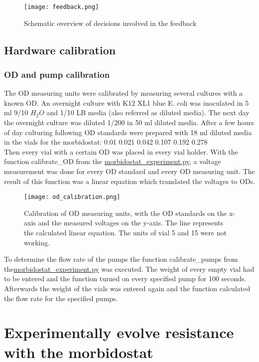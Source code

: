 \begin{figure}
	\texttt{[image: feedback.png]}
	\caption{Schematic overview of decisions involved in the feedback}
	\label{figure:feedback}
\end{figure}

\subsection{Hardware calibration}
\subsubsection{OD and pump calibration}
The OD measuring units were calibrated by measuring several cultures with a known OD.
An overnight culture with K12 XL1 blue E. coli was inoculated in 5 ml 9/10 $H_2O$ and 1/10 LB media (also referred as diluted media). The next day the overnight culture was diluted 1/200 in 50 ml diluted media. After a few hours of day culturing following OD standards were prepared with 18 ml diluted media in the vials for the morbidostat: 0.01 0.021 0.042 0.107 0.192 0.278\\
Then every vial with a certain OD was placed in every vial holder. With the function calibrate\_OD from the \href{https://github.com/nahanoo/ESBL\_project/}{morbidostat\_experiment.py}, a voltage measurement was done for every OD standard and every OD measuring unit. The result of this function was a linear equation which translated the voltages to ODs. \\
\begin{figure}
	\texttt{[image: od\_calibration.png]}
	\caption{Calibration of OD measuring units, with the OD standards on the x-axis and the measured voltages on the y-axis. The line represents the calculated linear equation. The units of vial 5 and 15 were not working.}
\end{figure}
To determine the flow rate of the pumps the function calibrate\_pumps from the\href{https://github.com/nahanoo/ESBL\_project/}{morbidostat\_experiment.py} was executed. The weight of every empty vial had to be entered and the function turned on every specified pump for 100 seconds. Afterwards the weight of the vials was entered again and the function calculated the flow rate for the specified pumps. 
\label{section:OD_calibration}

\section{Experimentally evolve resistance with the morbidostat}
